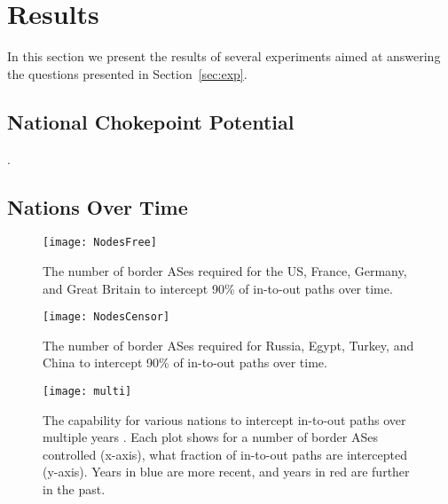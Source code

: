 \section{Results}

In this section we present the results of several experiments aimed at
answering the questions presented in Section~\ref{sec:exp}. 


\subsection{National Chokepoint Potential}

. 

\subsection{Nations Over Time}


\begin{figure}
	\centering
	\texttt{[image: NodesFree]}
	\caption{The number of border ASes required for the US, France, Germany, and Great Britain to intercept 90\% of in-to-out paths over time.}\label{fig:nodesFree}
\end{figure}
\begin{figure}
	\centering
	\texttt{[image: NodesCensor]}
	\caption{The number of border ASes required for Russia, Egypt, Turkey, and China to intercept 90\% of in-to-out paths over time.}\label{fig:nodesCensor}
\end{figure}
\begin{figure*}
	\centering
	\texttt{[image: multi]}
	\caption{The capability for various nations to intercept in-to-out paths over multiple years \timerange. Each plot shows for a number of border ASes controlled (x-axis),
	what fraction of in-to-out paths are intercepted (y-axis). Years in blue are more recent, and years in red are further in the past.}\label{fig:multiTime}
\end{figure*}

